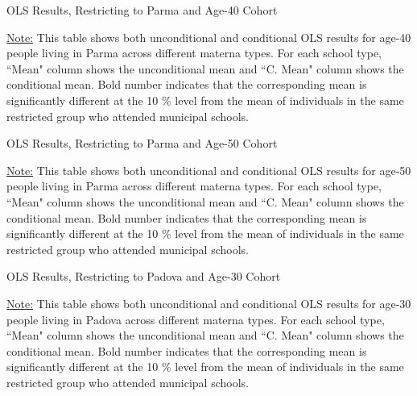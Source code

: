\documentclass[11pt]{article}
\begin{document}
\begin{table}[H]
\begin{center}
	\caption{OLS Results, Restricting to Parma and Age-40 Cohort} \label{table:OLS-P40-E}
	\scalebox{0.72}{
		
	}
	\end{center}
	\footnotesize
\underline{Note:} This table shows both unconditional and conditional OLS results for age-40 people living in Parma across different materna types. For each school type, ``Mean" column shows the unconditional mean and ``C. Mean" column shows the conditional mean. Bold number indicates that the corresponding mean is significantly different at the 10 \% level from the mean of individuals in the same restricted group who attended municipal schools.

\end{table}

\begin{table}[H]
\begin{center}
	\caption{OLS Results, Restricting to Parma and Age-50 Cohort} \label{table:OLS-P50-E}
	\scalebox{0.75}{
		
	}
	\end{center}
	\footnotesize
\underline{Note:} This table shows both unconditional and conditional OLS results for age-50 people living in Parma across different materna types. For each school type, ``Mean" column shows the unconditional mean and ``C. Mean" column shows the conditional mean. Bold number indicates that the corresponding mean is significantly different at the 10 \% level from the mean of individuals in the same restricted group who attended municipal schools.

\end{table}

\begin{table}[H]
\begin{center}
	\caption{OLS Results, Restricting to Padova and Age-30 Cohort} \label{table:OLS-V30-E}
	\scalebox{0.73}{
		
	}
	\end{center}
	\footnotesize
\underline{Note:} This table shows both unconditional and conditional OLS results for age-30 people living in Padova across different materna types. For each school type, ``Mean" column shows the unconditional mean and ``C. Mean" column shows the conditional mean. Bold number indicates that the corresponding mean is significantly different at the 10 \% level from the mean of individuals in the same restricted group who attended municipal schools.

\end{table}
\end{document}
